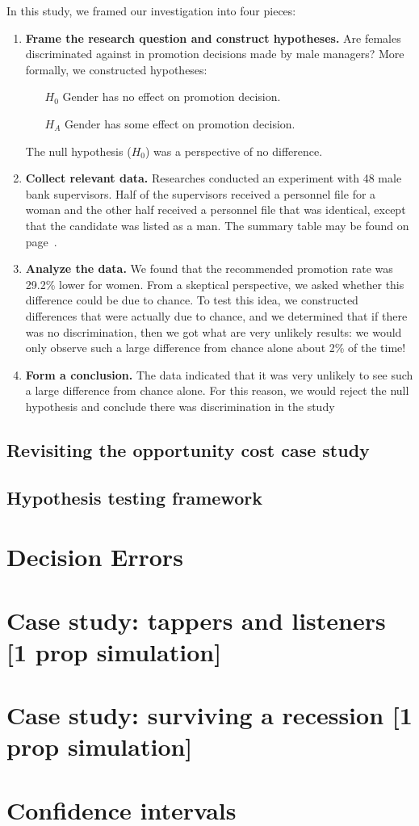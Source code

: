 In this study, we framed our investigation into four pieces:
\begin{enumerate}
\item \textbf{Frame the research question and construct hypotheses.} Are females discriminated against in promotion decisions made by male managers? More formally, we constructed hypotheses:
\begin{itemize}
\item[$H_0$] Gender has no effect on promotion decision.
\item[$H_A$] Gender has some effect on promotion decision.
\end{itemize}
The null hypothesis ($H_0$) was a perspective of no difference.
\item \textbf{Collect relevant data.} Researches conducted an experiment with 48 male bank supervisors. Half of the supervisors received a personnel file for a woman and the other half received a personnel file that was identical, except that the candidate was listed as a man. The summary table may be found on page~\pageref{discriminationResults}.
\item \textbf{Analyze the data.} We found that the recommended promotion rate was 29.2\% lower for women. From a skeptical perspective, we asked whether this difference could be due to chance. To test this idea, we constructed differences that were actually due to chance, and we determined that if there was no discrimination, then we got what are very unlikely results: we would only observe such a large difference from chance alone about 2\% of the time!
\item \textbf{Form a conclusion.} The data indicated that it was very unlikely to see such a large difference from chance alone. For this reason, we would reject the null hypothesis and conclude there was discrimination in the study
\end{enumerate}


\subsection{Revisiting the opportunity cost case study}


\subsection{Hypothesis testing framework}


\section{Decision Errors}


\section{Case study: tappers and listeners [1 prop simulation]}


\section{Case study: surviving a recession [1 prop simulation]}


\section{Confidence intervals}

